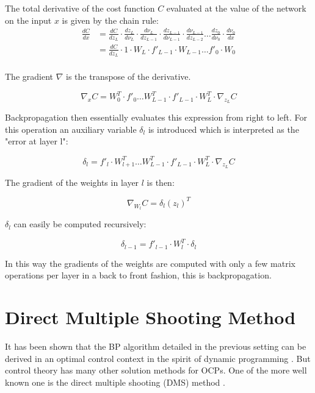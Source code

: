 The total derivative of the cost function $C$ evaluated at the value of the network on the input $x$ is given by the chain rule:
\begin{equation}
	\begin{aligned}
	\frac{dC}{dx} &= \frac{dC}{dz_L}\cdot \frac{dz_L}{d\nu_L}\cdot \frac{d\nu_L}{dz_{L-1}}\cdot \frac{dz_{L-1}}{d\nu_{L-1}} \cdot \frac{d\nu_{L-1}}{dz_{L-2}}\dots\frac{dz_0}{d\nu_0}\cdot\frac{d\nu_0}{dx} \\
	&= \frac{dC}{dz_L}\cdot 1 \cdot W_L \cdot f'_{L-1} \cdot W_{L-1} \dots f'_0 \cdot W_0 \\
	\end{aligned}
\end{equation}

The gradient $\nabla$ is the transpose of the derivative.

\begin{equation}
\nabla_xC = W_0^T \cdot f'_0 \dots W_{L-1}^T \cdot f'_{L-1} \cdot W_L^T \cdot \nabla_{z_L}C
\end{equation}

Backpropagation then essentially evaluates this expression from right to left. For this operation an auxiliary variable $\delta_l$ is introduced which is interpreted as the "error at layer l":

\begin{equation}
\delta_l = f'_l \cdot W_{l+1}^T \dots W_{L-1}^T \cdot f'_{L-1} \cdot W_L^T \cdot \nabla_{z_L}C
\end{equation}

The gradient of the weights in layer $l$ is then:

\begin{equation}
\nabla_{W_l}C=\delta_l(z_l)^T
\end{equation}

$\delta_l$ can easily be computed recursively:

\begin{equation}
\delta_{l-1}  = f'_{l-1} \cdot W_l^T \cdot \delta_l
\end{equation}

In this way the gradients of the weights are computed with only a few matrix operations per layer in a back to front fashion, this is backpropagation.


\section{Direct Multiple Shooting Method}
It has been shown that the BP algorithm detailed in the previous setting can be derived in an optimal control context in the spirit of dynamic programming \cite{mizutani2000}. But control theory has many other solution methods for OCPs. One of the more well known one is the direct multiple shooting (DMS) method \cite{bock1984multiple}.

